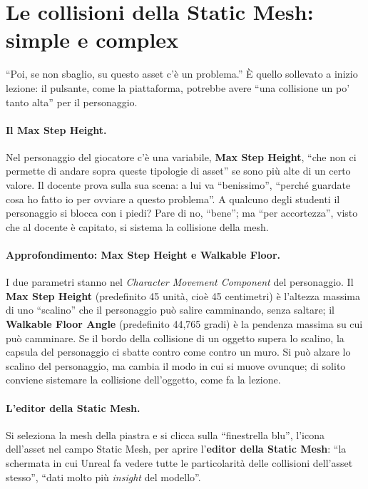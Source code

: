 \section{Le collisioni della Static Mesh: simple e complex}
\label{ue7:sec:collisioni}

``Poi, se non sbaglio, su questo asset c'è un problema.'' È quello sollevato a inizio
lezione: il pulsante, come la piattaforma, potrebbe avere ``una collisione un po' tanto
alta'' per il personaggio.

\paragraph{Il Max Step Height.} Nel personaggio del giocatore c'è una variabile,
\textbf{Max Step Height}, ``che non ci permette di andare sopra queste tipologie di
asset'' se sono più alte di un certo valore. Il docente prova sulla sua scena: a lui va
``benissimo'', ``perché guardate cosa ho fatto io per ovviare a questo problema''. A
qualcuno degli studenti il personaggio si blocca con i piedi? Pare di no, ``bene''; ma
``per accortezza'', visto che al docente è capitato, si sistema la collisione della mesh.

\paragraph{Approfondimento: Max Step Height e Walkable Floor.} I due parametri stanno nel
\emph{Character Movement Component} del personaggio. Il \textbf{Max Step Height}
(predefinito 45 unità, cioè 45 centimetri) è l'altezza massima di uno ``scalino'' che il
personaggio può salire camminando, senza saltare; il \textbf{Walkable Floor Angle}
(predefinito 44,765 gradi) è la pendenza massima su cui può camminare. Se il bordo della
collisione di un oggetto supera lo scalino, la capsula del personaggio ci sbatte contro
come contro un muro. Si può alzare lo scalino del personaggio, ma cambia il modo in cui
si muove ovunque; di solito conviene sistemare la collisione dell'oggetto, come fa la
lezione.

\paragraph{L'editor della Static Mesh.} Si seleziona la mesh della piastra e si clicca
sulla ``finestrella blu'', l'icona dell'asset nel campo Static Mesh, per aprire
l'\textbf{editor della Static Mesh}: ``la schermata in cui Unreal fa vedere tutte le
particolarità delle collisioni dell'asset stesso'', ``dati molto più \emph{insight} del
modello''.

